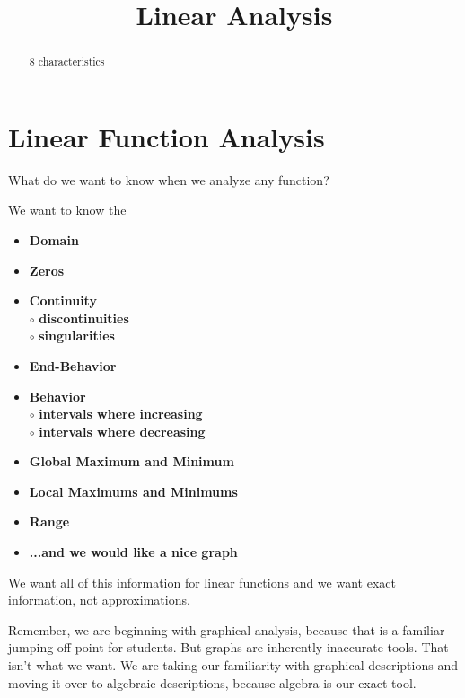 \documentclass{ximera}
\title{Linear Analysis}
\begin{document}
\begin{abstract}
8 characteristics
\end{abstract}
\maketitle





\section*{Linear Function Analysis}

What do we want to know when we analyze any function?

We want to know the 
\begin{itemize}
     \item \textbf{\textcolor{red!70!black}{Domain}} 
     \item \textbf{\textcolor{red!70!black}{Zeros}} 
     \item \textbf{\textcolor{red!70!black}{Continuity}} \\
     \text{    }$\circ$ \textbf{\textcolor{purple!85!blue}{discontinuities}}\\
     \text{    }$\circ$ \textbf{\textcolor{purple!85!blue}{singularities}}\\
     \item \textbf{\textcolor{red!70!black}{End-Behavior}} 
     \item \textbf{\textcolor{red!70!black}{Behavior}} \\
     \text{    }$\circ$ \textbf{\textcolor{purple!85!blue}{intervals where increasing}}\\
     \text{    }$\circ$ \textbf{\textcolor{purple!85!blue}{intervals where decreasing}}\\
     \item \textbf{\textcolor{red!70!black}{Global Maximum and Minimum}} 
     \item \textbf{\textcolor{red!70!black}{Local Maximums and Minimums}} 
     \item \textbf{\textcolor{red!70!black}{Range}} 
     \item \textbf{\textcolor{blue!55!black}{...and we would like a nice graph}} 
\end{itemize}

We want all of this information for linear functions and we want exact information, not approximations. 

Remember, we are beginning with graphical analysis, because that is a familiar jumping off point for students.  But graphs are inherently inaccurate tools.  That isn't what we want. We are taking our familiarity with graphical descriptions and moving it over to algebraic descriptions, because algebra is our exact tool. 
\end{document}
